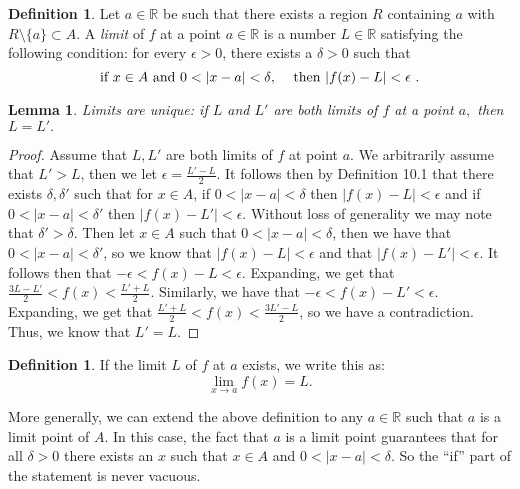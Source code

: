 \documentclass[12pt]{article}
\newcommand{\bbR}{\mathbb{R}}
\providecommand{\abs}[1]{\lvert #1 \rvert}
\providecommand{\sarr}{\rightarrow}
\renewcommand{\_}[1]{\underline{ #1 }}
\newtheorem{lemma}[theorem]{Lemma}
\theoremstyle{definition}
\newtheorem{definition}[theorem]{Definition}
\numberwithin{equation}{subsection}
\begin{document}
\begin{definition}  Let $a \in \bbR$ be such that there exists a region $R$ containing $a$ with $R\setminus \lbrace a \rbrace \subset A.$  A \emph{limit} of $f$ at a point $a \in \bbR$ is a number $L \in \bbR$ satisfying the following condition: for every $\epsilon > 0$, there exists a $\delta > 0$ such that 
\[
\text{if $x \in A$ and $0 < \abs{x - a} < \delta$, \quad then $\abs{f(x) - L } < \epsilon$ }.
\]
\end{definition}

\begin{lemma} Limits are unique:  if $L$ and $L'$ are both limits of $f$ at a point $a,$ then $L=L'.$ 
\end{lemma}

\begin{proof}
Assume that $L,L'$ are both limits of $f$ at point $a$. We arbitrarily assume that $L' > L$, then we let $\epsilon = \frac{L' - L}{2}$. It follows then by Definition 10.1 that there exists $\delta, \delta'$ such that for $x \in A$, if $0 < \abs{x - a} < \delta$ then $\abs{f(x) - L} < \epsilon$ and if $0 < \abs{x - a} < \delta'$ then $\abs{f(x) - L'} < \epsilon$. Without loss of generality we may note that $\delta' > \delta$. Then let $x \in A$ such that $0  < \abs{x - a} < \delta$, then we have that $0  < \abs{x - a} < \delta'$, so we know that $\abs{f(x) - L} < \epsilon$ and that $\abs{f(x) - L'} < \epsilon$. It follows then that $-\epsilon < f(x) - L < \epsilon$. Expanding, we get that $\frac{3L - L'}{2} < f(x) < \frac{L' + L}{2}$. Similarly, we have that $-\epsilon < f(x) - L' < \epsilon$. Expanding, we get that $\frac{L' + L}{2} < f(x) < \frac{3L' - L}{2}$, so we have a contradiction. Thus, we know that $L' = L$.
\end{proof}

\begin{definition} If the limit $L$ of $f$ at $a$ exists, we write this as:
\[
\lim_{x \sarr a} f(x) = L.
\]
\end{definition}

More generally, we can extend the above definition to any $a \in \bbR$ such that $a$ is a limit point of $A$.  In this case, the fact that $a$ is a limit point guarantees that for all $\delta > 0$ there exists an $x$ such that $x \in A$ and $0 < \abs{x -a } < \delta$.  So the ``if'' part of the statement is never vacuous.  


\end{document}
